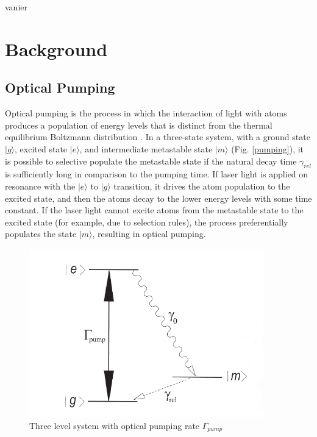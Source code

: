 vanier%

\section{Background}\label{background}

\subsection{Optical Pumping}\label{opticalpumping}

Optical pumping is the process in which the interaction of light with
atoms produces a population of energy levels that is distinct from the
thermal equilibrium Boltzmann distribution \cite{bernheim}. In a
three-state system, with a ground state $|g\rangle$, excited state
$|e\rangle$, and intermediate metastable state $|m\rangle$
(Fig. \ref{pumping}), it is possible to selective populate the metastable
state if the natural decay time $\gamma_{rel}$ is sufficiently long in
comparison to the pumping time. If laser light is applied on resonance
with the $|e\rangle$ to $|g\rangle$ transition, it drives the atom
population to the excited state, and then the atoms decay to the lower
energy levels with some time constant. If the laser light cannot
excite atoms from the metastable state to the excited state (for
example, due to selection rules), the process preferentially populates
the state $|m\rangle$, resulting in optical pumping.


\begin{figure}[h]
\begin{center}
\includegraphics[width=4in]{figures/pumping.eps}
\caption{\small{Three level system with optical pumping rate $\Gamma_{pump}$}}
\label{fig:pumping}
\end{center}
\end{figure}


